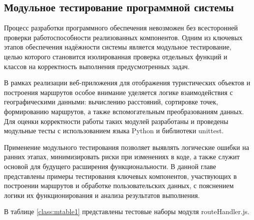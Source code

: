 \subsection{Модульное тестирование программной системы}

Процесс разработки программного обеспечения невозможен без всесторонней проверки работоспособности реализованных компонентов\cite{b26}. Одним из ключевых этапов обеспечения надёжности системы является модульное тестирование, целью которого становится изолированная проверка отдельных функций и классов на корректность выполнения предусмотренных задач.

В рамках реализации веб-приложения для отображения туристических объектов и построения маршрутов особое внимание уделяется логике взаимодействия с географическими данными: вычислению расстояний, сортировке точек, формированию маршрутов, а также вспомогательным преобразованиям данных. Для оценки корректности работы таких модулей разработаны и проведены модульные тесты с использованием языка Python и библиотеки unittest.

Применение модульного\cite{b27} тестирования позволяет выявлять логические ошибки на ранних этапах, минимизировать риски при изменениях в коде, а также служит основой для будущего расширения функциональности. В данной главе представлены примеры тестирования ключевых компонентов, участвующих в построении маршрутов и обработке пользовательских данных, с пояснением логики их функционирования и анализа результатов выполнения.

В таблице \ref{class:mtable1} представлены тестовые наборы модуля routeHandler.js.

